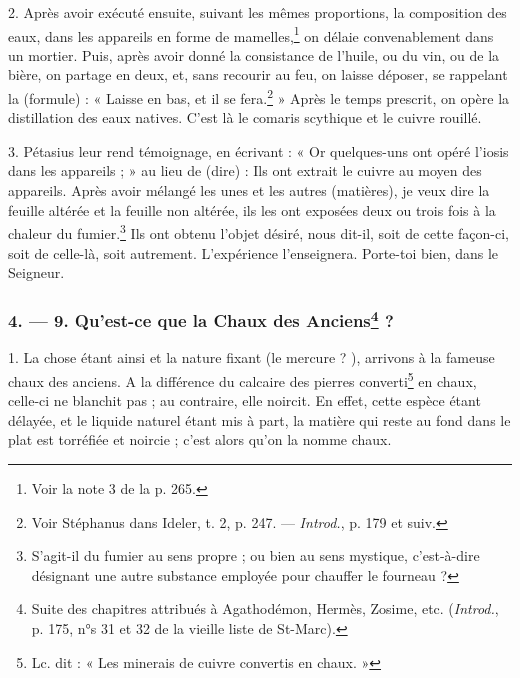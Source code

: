 \documentclass[a4paper, 11pt, oneside, polutonikogreek, french]{article}
\begin{document}
2. Après avoir exécuté ensuite, suivant les mêmes proportions, la composition des eaux, dans les appareils en forme de mamelles,\footnote{Voir la note 3 de la p. 265.} on délaie convenablement dans un mortier. Puis, après avoir donné la consistance de l'huile, ou du vin, ou de la bière, on partage en deux, et, sans recourir au feu, on laisse déposer, se rappelant la (formule) : « Laisse en bas, et il se fera.\footnote{Voir Stéphanus dans Ideler, t. 2, p. 247. --- \emph{Introd.}, p. 179 et suiv.} » Après le temps prescrit, on opère la distillation des eaux natives. C'est là le comaris scythique et le cuivre rouillé.

3. Pétasius leur rend témoignage, en écrivant : « Or quelques-uns ont opéré l'iosis dans les appareils ; » au lieu de (dire) : Ils ont extrait le cuivre au moyen des appareils. Après avoir mélangé les unes et les autres (matières), je veux dire la feuille altérée et la feuille non altérée, ils les ont exposées deux ou trois fois à la chaleur du fumier.\footnote{S'agit-il du fumier au sens propre ; ou bien au sens mystique, c'est-à-dire désignant une autre substance employée pour chauffer le fourneau ?} Ils ont obtenu l'objet désiré, nous dit-il, soit de cette façon-ci, soit de celle-là, soit autrement. L'expérience l'enseignera. Porte-toi bien, dans le Seigneur.

\bigskip
\centerline{\EightStarTaper}
\centerline{\EightStarTaper\EightStarTaper}
\bigskip

\subsubsection[4. --- 9. Qu'est-ce que la Chaux des Anciens ?]{4. --- 9. Qu'est-ce que la Chaux des Anciens\footnote{Suite des chapitres attribués à Agathodémon, Hermès, Zosime, etc. (\emph{Introd.}, p. 175, n°s 31 et 32 de la vieille liste de St-Marc).} ?}

1. La chose étant ainsi et la nature fixant (le mercure ? ), arrivons à la fameuse chaux des anciens. A la différence du calcaire des pierres converti\footnote{Lc. dit : « Les minerais de cuivre convertis en chaux. »} en chaux, celle-ci ne blanchit pas ; au contraire, elle noircit. En effet, cette espèce étant délayée, et le liquide naturel étant mis à part, la matière qui reste au fond dans le plat est torréfiée et noircie ; c'est alors qu'on la nomme chaux.
\end{document}
